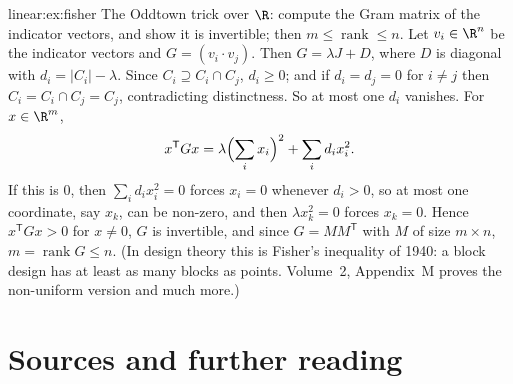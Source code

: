 \begin{solution}{linear:ex:fisher}
\idea The Oddtown trick over $\R$: compute the Gram matrix of the indicator vectors, and show it is invertible; then
$m\le\operatorname{rank}\le n$.
\writeup Let $v_i\in\R^n$ be the indicator vectors and $G=(v_i\cdot v_j)$. Then $G=\lambda J+D$, where $D$ is diagonal with
$d_i=|C_i|-\lambda$. Since $C_i\supseteq C_i\cap C_j$, $d_i\ge0$; and if $d_i=d_j=0$ for $i\ne j$ then $C_i=C_i\cap C_j=C_j$,
contradicting distinctness. So at most one $d_i$ vanishes. For $x\in\R^m$,
\[
x^{\mathsf T}Gx=\lambda\Bigl(\sum_ix_i\Bigr)^2+\sum_id_ix_i^2.
\]
If this is $0$, then $\sum_id_ix_i^2=0$ forces $x_i=0$ whenever $d_i>0$, so at most one coordinate, say $x_k$, can be
non-zero, and then $\lambda x_k^2=0$ forces $x_k=0$. Hence $x^{\mathsf T}Gx>0$ for $x\ne0$, $G$ is invertible, and since
$G=MM^{\mathsf T}$ with $M$ of size $m\times n$, $m=\operatorname{rank}G\le n$. (In design theory this is Fisher's inequality of 1940:
a block design has at least as many blocks as points. Volume~2, Appendix~M proves the non-uniform version and much more.)
\end{solution}

\section*{Sources and further reading}

